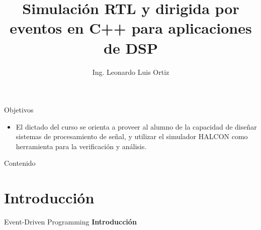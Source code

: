 \documentclass[11pt]{beamer}
\author[LLO]{Ing. Leonardo Luis Ortiz}
\title{Simulación RTL y dirigida por eventos en C++ para aplicaciones de DSP}
\institute[]{Instituto Balseiro \par Centro Atómico Bariloche}
\date{}
\begin{document}
	
	\begin{frame}
		\titlepage
	\end{frame}
	
	\begin{frame}{Objetivos}
	\begin{itemize}
		\item El dictado del curso se orienta a proveer al alumno de la capacidad de diseñar sistemas de procesamiento de señal, y utilizar el simulador HALCON como herramienta para la verificación y análisis.
	\end{itemize}
	\end{frame}
	
	\begin{frame}{Contenido}
		\tableofcontents 
	\end{frame}
	
	
	\section{Introducción}
	\begin{frame}{Event-Driven Programming}
	\huge \centering
	\textbf{Introducción}
	\end{frame}
	
\end{document}
